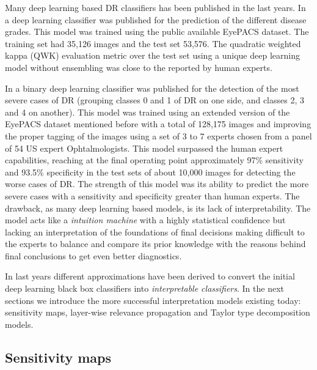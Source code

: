 \documentclass[preprint]{elsarticle}
\theoremstyle{definition} %
\theoremstyle{remark}
\begin{document}
Many deep learning based DR classifiers has been published in the last years. In \cite{DELATORRE2017} a deep learning classifier was published for the prediction of the different disease grades. This model was trained using the public available EyePACS dataset. The training set had 35,126 images and the test set 53,576. The quadratic weighted kappa (QWK) evaluation metric \cite{cohen1968weighted} over the test set using a unique deep learning model without ensembling was close to the reported by human experts. 

In \cite{doi:10.1001/jama.2016.17216} a binary deep learning classifier was published for the detection of the most severe cases of DR (grouping classes 0 and 1 of DR on one side, and classes 2, 3 and 4 on another). This model was trained using an extended version of the EyePACS dataset mentioned before with a total of 128,175 images and improving the proper tagging of the images using a set of 3 to 7 experts chosen from a panel of 54 US expert Ophtalmologists. This model surpassed the human expert capabilities, reaching at the final operating point approximately  97\% sensitivity and 93.5\% specificity in the test sets of about 10,000 images for detecting the worse cases of DR. The strength of this model was its ability to predict the more severe cases with a sensitivity and specificity greater than human experts. The drawback, as many deep learning based models, is its lack of interpretability. The model acts like a \emph{intuition machine} with a highly statistical confidence but lacking an interpretation of the foundations of final decisions making difficult to the experts to balance and compare its prior knowledge with the reasons behind final conclusions to get even better diagnostics.

In last years different approximations have been derived to convert the initial deep learning black box classifiers into \emph{interpretable classifiers}. In the next sections we introduce the more successful interpretation models existing today: sensitivity maps, layer-wise relevance propagation and Taylor type decomposition models. 

\subsection{Sensitivity maps}
\end{document}
